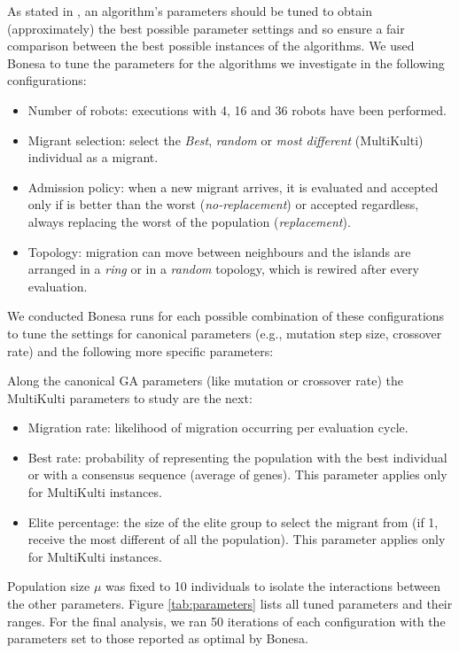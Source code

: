 \documentclass[runningheads]{llncs}
\begin{document}
As stated in \cite{PARAMETERTUNING}, an algorithm's parameters should be tuned to obtain (approximately) the best possible parameter settings and so ensure a fair comparison between the best possible instances of the algorithms.
We used Bonesa \cite{BONESA} to tune the parameters for the algorithms we investigate in the following configurations:
\begin{itemize}
\item Number of robots: executions with 4, 16 and 36 robots have been performed.
\item Migrant selection: select the {\em Best}, {\em random } or {\em most different} (MultiKulti) individual as a migrant. 
\item Admission policy: when a new migrant arrives, it is evaluated and accepted only if is better than the worst ({\em no-replacement}) or accepted regardless, always replacing the worst of the population ({\em replacement}).
\item Topology: migration can move between neighbours and the islands are arranged in a {\em ring} or in a {\em random} topology, which is rewired after every evaluation.
\end{itemize}

We conducted Bonesa runs for each possible combination of these configurations to tune the settings for canonical parameters (e.g., mutation step size, crossover rate) and the following more specific parameters:

Along the canonical GA parameters (like mutation or crossover rate) the MultiKulti parameters to study are the next:
\begin{itemize}
\item Migration rate: likelihood of migration occurring per evaluation cycle.
\item Best rate: probability of representing the population with the best individual or with a consensus sequence (average of genes). This parameter applies only for MultiKulti instances.
\item Elite percentage: the size of the elite group to select the migrant from (if 1, receive the most different of all the population). This parameter applies only for MultiKulti instances.
\end{itemize}

Population size $\mu$ was fixed to 10 individuals to isolate the
interactions between the other parameters. Figure \ref{tab:parameters}
lists all tuned parameters and their ranges. For the final analysis,
we ran 50 iterations of each configuration with the parameters set to
those reported as optimal by Bonesa. 
\end{document}
